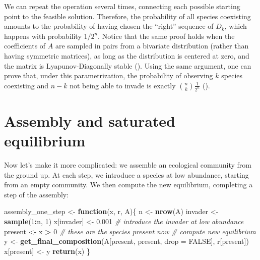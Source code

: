 \documentclass[
]{book}
\newenvironment{Shaded}{\begin{snugshade}}{\end{snugshade}}
\newcommand{\CommentTok}[1]{\textcolor[rgb]{0.56,0.35,0.01}{\textit{#1}}}
\newcommand{\ControlFlowTok}[1]{\textcolor[rgb]{0.13,0.29,0.53}{\textbf{#1}}}
\newcommand{\DataTypeTok}[1]{\textcolor[rgb]{0.13,0.29,0.53}{#1}}
\newcommand{\DecValTok}[1]{\textcolor[rgb]{0.00,0.00,0.81}{#1}}
\newcommand{\FloatTok}[1]{\textcolor[rgb]{0.00,0.00,0.81}{#1}}
\newcommand{\KeywordTok}[1]{\textcolor[rgb]{0.13,0.29,0.53}{\textbf{#1}}}
\newcommand{\NormalTok}[1]{#1}
\newcommand{\OperatorTok}[1]{\textcolor[rgb]{0.81,0.36,0.00}{\textbf{#1}}}
\newcommand{\OtherTok}[1]{\textcolor[rgb]{0.56,0.35,0.01}{#1}}
\newcommand{\StringTok}[1]{\textcolor[rgb]{0.31,0.60,0.02}{#1}}
\begin{document}
We can repeat the operation several times, connecting each possible starting point to the feasible solution. Therefore, the probability of all species coexisting amounts to the probability of having chosen the ``right'' sequence of \(D_k\), which happens with probability \(1 / 2^n\). Notice that the same proof holds when the coefficients of \(A\) are sampled in pairs from a bivariate distribution (rather than having symmetric matrices), as long as the distribution is centered at zero, and the matrix is Lyapunov-Diagonally stable (\citet{servan2018coexistence}). Using the same argument, one can prove that, under this parametrization, the probability of observing \(k\) species coexisting and \(n -k\) not being able to invade is exactly \(\binom{n}{k} \frac{1}{2^n}\) (\citet{servan2018coexistence}).

\hypertarget{assembly-and-saturated-equilibrium}{%
\section{Assembly and saturated equilibrium}\label{assembly-and-saturated-equilibrium}}

Now let's make it more complicated: we assemble an ecological community from the ground up. At each step, we introduce a species at low abundance, starting from an empty community. We then compute the new equilibrium, completing a step of the assembly:

\begin{Shaded}
\begin{Highlighting}[]
\NormalTok{assembly_one_step <-}\StringTok{ }\ControlFlowTok{function}\NormalTok{(x, r, A)\{}
\NormalTok{  n <-}\StringTok{ }\KeywordTok{nrow}\NormalTok{(A)}
\NormalTok{  invader <-}\StringTok{ }\KeywordTok{sample}\NormalTok{(}\DecValTok{1}\OperatorTok{:}\NormalTok{n, }\DecValTok{1}\NormalTok{)}
\NormalTok{  x[invader] <-}\StringTok{ }\FloatTok{0.001} \CommentTok{# introduce the invader at low abundance}
\NormalTok{  present <-}\StringTok{ }\NormalTok{x }\OperatorTok{>}\StringTok{ }\DecValTok{0} \CommentTok{# these are the species present now}
  \CommentTok{# compute new equilibrium}
\NormalTok{  y <-}\StringTok{ }\KeywordTok{get_final_composition}\NormalTok{(A[present, present, }\DataTypeTok{drop =} \OtherTok{FALSE}\NormalTok{], r[present])}
\NormalTok{  x[present] <-}\StringTok{ }\NormalTok{y}
  \KeywordTok{return}\NormalTok{(x)}
\NormalTok{\}}
\end{Highlighting}
\end{Shaded}
\end{document}
